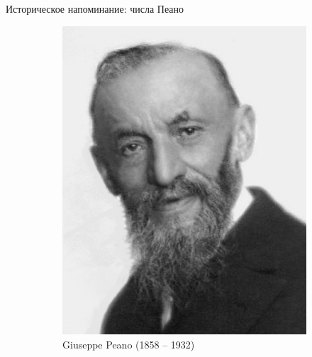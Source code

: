 \begin{frame}{Историческое напоминание: числа Пеано}
\begin{figure}[ht]
\begin{subfigure}[t]{.55\textwidth}
  \end{subfigure}
\hspace{1cm}
\begin{subfigure}[t]{.35\textwidth}
  \begin{minipage}{1\textwidth}
    \includegraphics[width=1\textwidth]{Giuseppe_Peano.jpg}\\
    Giuseppe Peano (1858 -- 1932)
  \end{minipage}
\end{subfigure}
\end{figure}
\end{frame}


